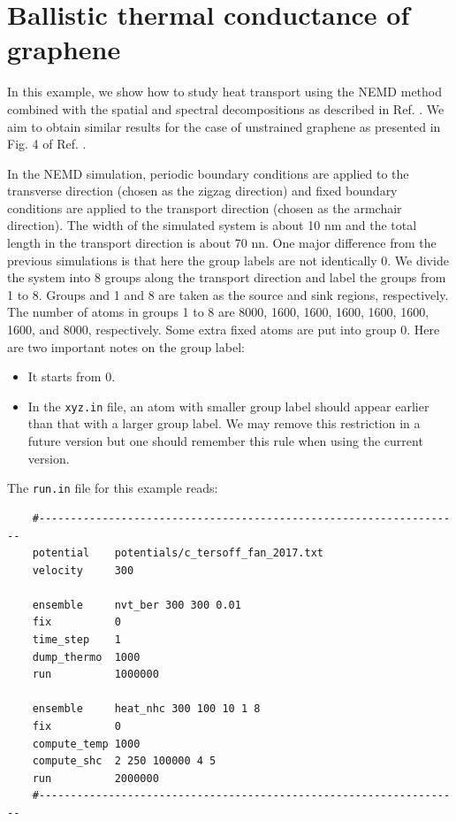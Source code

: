 \documentclass[12pt,a4paper]{report}
\begin{document}
\section{Ballistic thermal conductance of graphene}

In this example, we show how to study heat transport using the NEMD method combined with the spatial and spectral decompositions as described in Ref. \cite{fan2017prb}. We aim to obtain similar results for the case of unstrained graphene as presented in Fig. 4 of Ref. \cite{fan2017prb}.

In the NEMD simulation, periodic boundary conditions are applied to the transverse direction (chosen as the zigzag direction) and fixed boundary conditions are applied to the transport direction (chosen as the armchair direction). The width of the simulated system is about 10 nm and the total length in the transport direction is about 70 nn. One major difference from the previous simulations is that here the group labels are not identically 0. We divide the system into 8 groups along the transport direction and label the groups from 1 to 8. Groups and 1 and 8 are taken as the source and sink regions, respectively. The number of atoms in groups 1 to 8 are 8000, 1600, 1600, 1600, 1600, 1600, 1600, and 8000, respectively. Some extra fixed atoms are put into group 0. Here are two important notes on the group label:
\begin{itemize}
\item It starts from 0.
\item In the \verb"xyz.in" file, an atom with smaller group label should appear earlier than that with a larger group label. We may remove this restriction in a future version but one should remember this rule when using the current version.
\end{itemize}

The \verb"run.in" file for this example reads:
\begin{verbatim}
    #-------------------------------------------------------------------
    potential    potentials/c_tersoff_fan_2017.txt
    velocity     300

    ensemble     nvt_ber 300 300 0.01
    fix          0
    time_step    1
    dump_thermo  1000
    run          1000000

    ensemble     heat_nhc 300 100 10 1 8
    fix          0
    compute_temp 1000
    compute_shc  2 250 100000 4 5
    run          2000000
    #-------------------------------------------------------------------
\end{verbatim}
\end{document}
